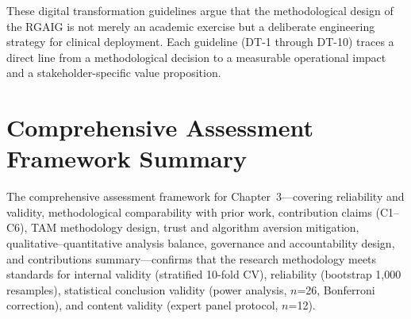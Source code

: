 These digital transformation guidelines argue that the methodological design of the RGAIG is not merely an academic exercise but a deliberate engineering strategy for clinical deployment. Each guideline (DT-1 through DT-10) traces a direct line from a methodological decision to a measurable operational impact and a stakeholder-specific value proposition.


\section{Comprehensive Assessment Framework Summary}
\label{sec:appx_assessment}

The comprehensive assessment framework for Chapter~3---covering reliability and validity, methodological comparability with prior work, contribution claims (C1--C6), TAM methodology design, trust and algorithm aversion mitigation, qualitative--quantitative analysis balance, governance and accountability design, and contributions summary---confirms that the research methodology meets standards for internal validity (stratified 10-fold CV), reliability (bootstrap 1,000 resamples), statistical conclusion validity (power analysis, $n$=26, Bonferroni correction), and content validity (expert panel protocol, $n$=12).
